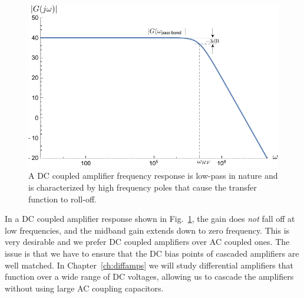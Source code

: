 \begin{figure}[tb]
\centering
\includegraphics[width=.75\columnwidth]{amp_dccoup} 
\caption{A DC coupled amplifier frequency response is low-pass in nature and is characterized by high frequency poles that cause the transfer function to roll-off.}
\label{fig:amp_dccoup}
\end{figure}
In a DC coupled amplifier response shown in Fig.~\ref{fig:amp_dccoup}, the gain does \textit{not} fall off at low frequencies, and the midband gain extends down to zero frequency. This is very desirable and we prefer DC coupled amplifiers over AC coupled ones.  The issue is that we have to ensure that the DC bias points of cascaded amplifiers are well matched.  In Chapter~\ref{ch:diffamps} we will study differential amplifiers that function over a wide range of DC voltages, allowing us to cascade the amplifiers without using large AC coupling capacitors.
